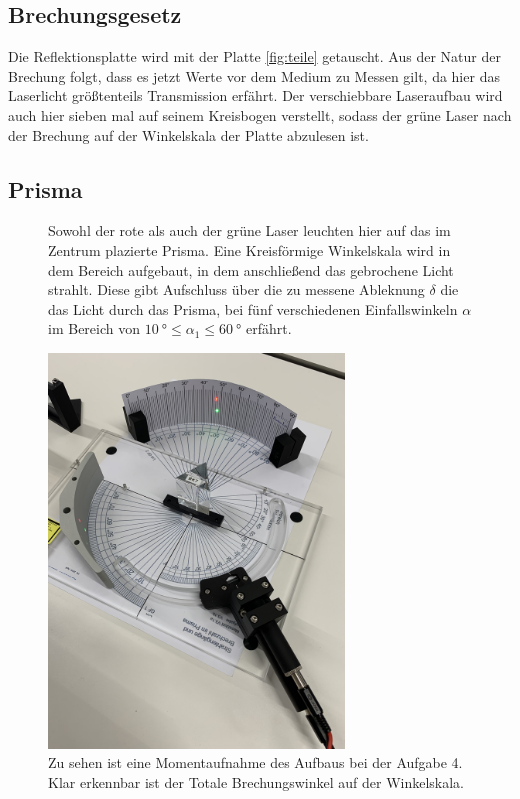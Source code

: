 \subsection{Brechungsgesetz}
Die Reflektionsplatte wird mit der Platte \ref{fig:teile} getauscht. Aus der Natur der Brechung folgt, dass es jetzt Werte 
vor dem Medium zu Messen gilt, da hier das Laserlicht größtenteils Transmission erfährt.
Der verschiebbare Laseraufbau wird auch hier sieben mal auf seinem Kreisbogen verstellt, sodass der grüne Laser 
nach der Brechung auf der Winkelskala der Platte abzulesen ist. 

\subsection{Prisma}
\begin{figure}
    \begin{minipage}[b]{0.5\textwidth}
Sowohl der rote als auch der grüne Laser leuchten hier auf das im Zentrum plazierte Prisma.
Eine Kreisförmige Winkelskala wird in dem Bereich aufgebaut, in dem anschließend das gebrochene Licht strahlt. Diese gibt Aufschluss
über die zu messene Ableknung $\delta$ die das Licht durch das Prisma, bei fünf verschiedenen Einfallswinkeln $\alpha$ im Bereich von 
$\SI{10}{\degree} \leq \alpha_1 \leq \SI{60}{\degree}$ erfährt.
\end{minipage}
\hfill
\begin{minipage}{0.5\textwidth}
        \centering
        \includegraphics[width=0.7\textwidth]{bilder/prisma.jpg}
        \caption{Zu sehen ist eine Momentaufnahme des Aufbaus bei der Aufgabe 4. \cite{skript} 
        Klar erkennbar ist der Totale Brechungswinkel auf der Winkelskala.}
    \end{minipage}
\end{figure}
\newpage
